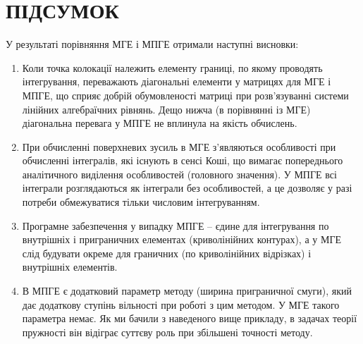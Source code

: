 \chapter{ПІДСУМОК}

У результаті порівняння МГЕ і МПГЕ отримали наступні висновки:

\begin{enumerate}
\item
  Коли точка колокації належить елементу границі, по якому проводять
  інтегрування, переважають діагональні елементи у матрицях для МГЕ і
  МПГЕ, що сприяє добрій обумовленості матриці при розв'язуванні системи
  лінійних алгебраїчних рівнянь. Дещо нижча (в порівнянні із МГЕ)
  діагональна перевага у МПГЕ не вплинула на якість обчислень.
\item
  При обчисленні поверхневих зусиль в МГЕ з'являються особливості при
  обчисленні інтегралів, які існують в сенсі Коші, що вимагає
  попереднього аналітичного виділення особливостей (головного значення).
  У МПГЕ всі інтеграли розглядаються як інтеграли без особливостей, а це
  дозволяє у разі потреби обмежуватися тільки числовим інтегруванням.
\item
  Програмне забезпечення у випадку МПГЕ -- єдине для інтегрування по
  внутрішніх і приграничних елементах (криволінійних контурах), а у МГЕ
  слід будувати окреме для граничних (по криволінійних відрізках) і
  внутрішніх елементів.
\item
  В МПГЕ є додатковий параметр методу (ширина приграничної смуги), який
  дає додаткову ступінь вільності при роботі з цим методом. У МГЕ такого
  параметра немає. Як ми бачили з наведеного вище прикладу, в задачах
  теорії пружності він відіграє суттєву роль при збільшені точності
  методу.
\end{enumerate}



